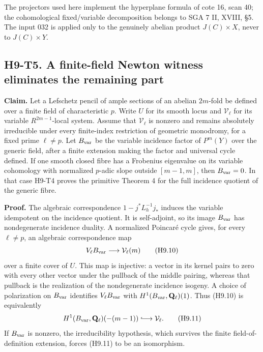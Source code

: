\documentclass[11pt,a4paper]{article}
\begin{document}
The projectors used here implement the hyperplane formula of cote 16,
scan 40; the cohomological fixed/variable decomposition belongs to
SGA 7 II, XVIII, \S5. The input 032 is applied only to the genuinely
abelian product $J(C)\times X$, never to $J(C)\times Y$.

\subsection*{H9-T5. A finite-field Newton witness eliminates the remaining part}

\textbf{Claim.} Let a Lefschetz pencil of ample sections of an abelian
$2m$-fold be defined over a finite field of characteristic $p$. Write
$U$ for its smooth locus and $\mathcal V_\ell$ for its variable
$R^{2m-1}$-local system. Assume that $\mathcal V_\ell$ is nonzero and
remains absolutely irreducible under every finite-index restriction of
geometric monodromy, for a fixed prime $\ell\ne p$. Let
$B_{\rm var}$ be the variable incidence factor of $P^m(Y)$ over the
generic field, after a finite extension making the factor and universal
cycle defined. If one smooth closed fibre has a Frobenius eigenvalue on
its variable cohomology with normalized $p$-adic slope outside
$[m-1,m]$, then $B_{\rm var}=0$. In that case H9-T4 proves the primitive
Theorem 4 for the full incidence quotient of the generic fibre.

\textbf{Proof.}
The algebraic correspondence $1-j^*L_h^{-1}j_*$ induces the variable
idempotent on the incidence quotient. It is self-adjoint, so its image
$B_{\rm var}$ has nondegenerate incidence duality. A normalized Poincar\'e
cycle gives, for every $\ell\ne p$, an algebraic correspondence map
\[
 V_\ell B_{\rm var}\longrightarrow\mathcal V_\ell(m)
                                                        \tag{H9.10}
\]
over a finite cover of $U$. This map is injective: a vector in its
kernel pairs to zero with every other vector under the pullback of the
middle pairing, whereas that pullback is the realization of the
nondegenerate incidence isogeny. A choice of polarization on
$B_{\rm var}$ identifies $V_\ell B_{\rm var}$ with
$H^1(B_{\rm var},\mathbf Q_\ell)(1)$. Thus (H9.10) is equivalently
\[
 H^1(B_{\rm var},\mathbf Q_\ell)(-(m-1))
       \lhook\joinrel\longrightarrow\mathcal V_\ell.       \tag{H9.11}
\]
If $B_{\rm var}$ is nonzero, the irreducibility hypothesis, which survives
the finite field-of-definition extension, forces (H9.11) to be an
isomorphism.
\end{document}
